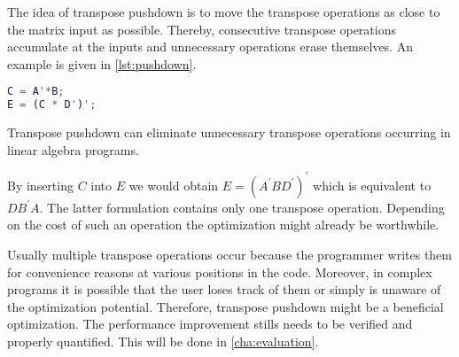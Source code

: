 The idea of transpose pushdown is to move the transpose operations as close to the matrix input as possible.
Thereby, consecutive transpose operations accumulate at the inputs and unnecessary operations erase themselves.
An example is given in \cref{lst:pushdown}.

\begin{listing}[!h]
	\begin{CenteredBox}
		\begin{lstlisting}[language=Matlab]
C = A'*B;
E = (C * D')';
		\end{lstlisting}
	\end{CenteredBox}
	\caption{Transpose pushdown can eliminate unnecessary transpose operations occurring in linear algebra programs.}
	\label{lst:pushdown}
\end{listing}

By inserting $C$ into $E$ we would obtain $E=(A^\prime BD^\prime)^\prime$ which is equivalent to $DB^\prime A$.
The latter formulation contains only one transpose operation.
Depending on the cost of such an operation the optimization might already be worthwhile.

Usually multiple transpose operations occur because the programmer writes them for convenience reasons at various positions in the code.
Moreover, in complex programs it is possible that the user loses track of them or simply is unaware of the optimization potential.
Therefore, transpose pushdown might be a beneficial optimization.
The performance improvement stills needs to be verified and properly quantified.
This will be done in \cref{cha:evaluation}.
